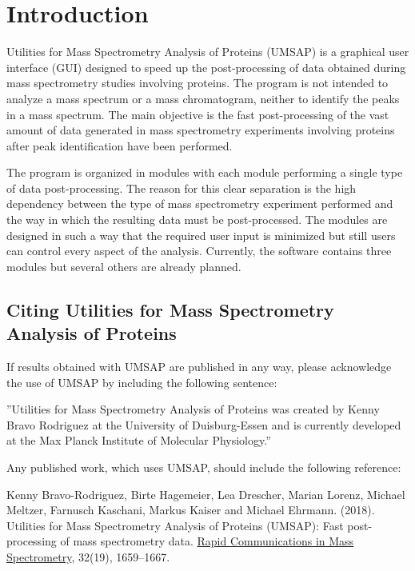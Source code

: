 \chapter{Introduction}

Utilities for Mass Spectrometry Analysis of Proteins (UMSAP) is a graphical user interface (GUI) designed to speed up the post-processing of data obtained during mass spectrometry studies involving proteins. The program is not intended to analyze a mass spectrum or a mass chromatogram, neither to identify the peaks in a mass spectrum. The main objective is the fast post-processing of the vast amount of data generated in mass spectrometry experiments involving proteins after peak identification have been performed.

The program is organized in modules with each module performing a single type of data post-processing. The reason for this clear separation is the high dependency between the type of mass spectrometry experiment performed and the way in which the resulting data must be post-processed. The modules are designed in such a way that the required user input is minimized but still users can control every aspect of the analysis. Currently, the software contains three modules but several others are already planned. 

\section{Citing Utilities for Mass Spectrometry Analysis of Proteins}

If results obtained with UMSAP are published in any way, please acknowledge the use of UMSAP by including the following sentence:

”Utilities for Mass Spectrometry Analysis of Proteins was created by Kenny Bravo Rodriguez at the University of Duisburg-Essen and is currently developed at the Max Planck Institute of Molecular Physiology.”

Any published work, which uses UMSAP, should include the following reference:

Kenny Bravo-Rodriguez, Birte Hagemeier, Lea Drescher, Marian Lorenz, Michael Meltzer, Farnusch Kaschani, Markus Kaiser and Michael Ehrmann. (\num{2018}). Utilities for Mass Spectrometry Analysis of Proteins (UMSAP): Fast post-processing of mass spectrometry data. \href{https://onlinelibrary.wiley.com/doi/10.1002/rcm.8243}{Rapid Communications in Mass Spectrometry}, \num{32}(\num{19}), \numrange[range-phrase = --]{1659}{1667}.

